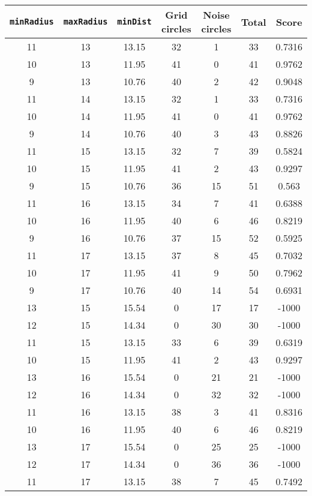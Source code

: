 \documentclass[letterpaper, 12pt]{article}
\begin{document}
\begin{longtable}{|c|c|c|c|c|c|c|}
\hline
\textbf{\texttt{minRadius}} & \textbf{\texttt{maxRadius}} & \textbf{\texttt{minDist}} & \textbf{Grid circles} & \textbf{Noise circles} & \textbf{Total} & \textbf{Score} \\
\hline
11 & 13 & 13.15 & 32 & 1 & 33 & 0.7316 \\
\hline
10 & 13 & 11.95 & 41 & 0 & 41 & 0.9762 \\
\hline
9 & 13 & 10.76 & 40 & 2 & 42 & 0.9048 \\
\hline
11 & 14 & 13.15 & 32 & 1 & 33 & 0.7316 \\
\hline
10 & 14 & 11.95 & 41 & 0 & 41 & 0.9762 \\
\hline
9 & 14 & 10.76 & 40 & 3 & 43 & 0.8826 \\
\hline
11 & 15 & 13.15 & 32 & 7 & 39 & 0.5824 \\
\hline
10 & 15 & 11.95 & 41 & 2 & 43 & 0.9297 \\
\hline
9 & 15 & 10.76 & 36 & 15 & 51 & 0.563 \\
\hline
11 & 16 & 13.15 & 34 & 7 & 41 & 0.6388 \\
\hline
10 & 16 & 11.95 & 40 & 6 & 46 & 0.8219 \\
\hline
9 & 16 & 10.76 & 37 & 15 & 52 & 0.5925 \\
\hline
11 & 17 & 13.15 & 37 & 8 & 45 & 0.7032 \\
\hline
10 & 17 & 11.95 & 41 & 9 & 50 & 0.7962 \\
\hline
9 & 17 & 10.76 & 40 & 14 & 54 & 0.6931 \\
\hline
13 & 15 & 15.54 & 0 & 17 & 17 & -1000 \\
\hline
12 & 15 & 14.34 & 0 & 30 & 30 & -1000 \\
\hline
11 & 15 & 13.15 & 33 & 6 & 39 & 0.6319 \\
\hline
10 & 15 & 11.95 & 41 & 2 & 43 & 0.9297 \\
\hline
13 & 16 & 15.54 & 0 & 21 & 21 & -1000 \\
\hline
12 & 16 & 14.34 & 0 & 32 & 32 & -1000 \\
\hline
11 & 16 & 13.15 & 38 & 3 & 41 & 0.8316 \\
\hline
10 & 16 & 11.95 & 40 & 6 & 46 & 0.8219 \\
\hline
13 & 17 & 15.54 & 0 & 25 & 25 & -1000 \\
\hline
12 & 17 & 14.34 & 0 & 36 & 36 & -1000 \\
\hline
11 & 17 & 13.15 & 38 & 7 & 45 & 0.7492 \\
\hline

\end{longtable}
\end{document}
